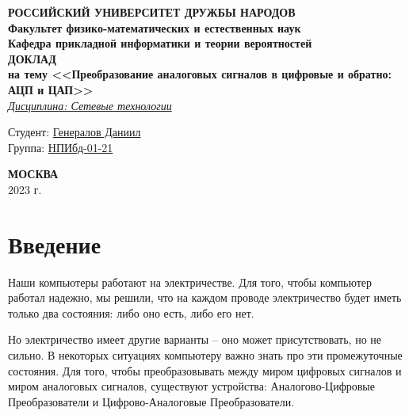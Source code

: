 \documentclass[a4page]{article}
\begin{document}
 
 
\begin{titlepage}

\begin{center}
\hfill \break
\textbf{
\large{РОССИЙСКИЙ УНИВЕРСИТЕТ ДРУЖБЫ НАРОДОВ}\\
\normalsize{Факультет физико-математических и естественных наук}\\ 
\normalsize{Кафедра прикладной информатики и теории вероятностей}\\
}
\vspace*{\fill}
\Large{\textbf{ДОКЛАД\\ на тему <<Преобразование аналоговых сигналов в цифровые и обратно: АЦП и ЦАП>>}}
\\
\underline{\textit{\normalsize{Дисциплина: Сетевые технологии}}}
\vspace*{\fill}

\end{center}
 
 \begin{flushright}
 Студент: \underline{Генералов Даниил}\\ \vspace{0.5cm}
 Группа: \underline{НПИбд-01-21}
 \end{flushright}
 
 
\begin{center} \textbf{МОСКВА} \\ 2023 г. \end{center}
\thispagestyle{empty} %
 
\end{titlepage}

\newpage

\tableofcontents

\newpage

\newcommand{\code}[1]{\texttt{#1}}

\section{Введение}

Наши компьютеры работают на электричестве.
Для того, чтобы компьютер работал надежно, мы решили, что на каждом проводе электричество будет иметь только два состояния:
либо оно есть, либо его нет.

Но электричество имеет другие варианты -- оно может присутствовать, но не сильно.
В некоторых ситуациях компьютеру важно знать про эти промежуточные состояния.
Для того, чтобы преобразовывать между миром цифровых сигналов и миром аналоговых сигналов,
существуют устройства: Аналогово-\-Цифровые Преобразователи и Цифрово-\-Аналоговые Преобразователи.
\end{document}

